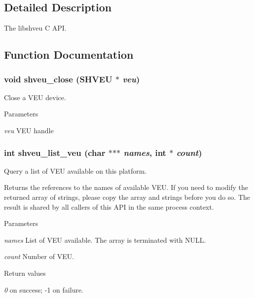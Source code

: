 \subsection{Detailed Description}
The libshveu C API. 

\subsection{Function Documentation}
\subsubsection[{shveu\_\-close}]{\setlength{\rightskip}{0pt plus 5cm}void shveu\_\-close (SHVEU $\ast$ {\em veu})}\label{shveu_8h_a84a58e9dc21e3597759d61284d2461f9}


Close a VEU device. 


\begin{DoxyParams}{Parameters}
\item[{\em veu}]VEU handle \end{DoxyParams}
\subsubsection[{shveu\_\-list\_\-veu}]{\setlength{\rightskip}{0pt plus 5cm}int shveu\_\-list\_\-veu (char $\ast$$\ast$$\ast$ {\em names}, \/  int $\ast$ {\em count})}\label{shveu_8h_a5496790d4d6f0b2d0b5524a9e0cd2e64}


Query a list of VEU available on this platform. 

Returns the references to the names of available VEU. If you need to modify the returned array of strings, please copy the array and strings before you do so. The result is shared by all callers of this API in the same process context. 
\begin{DoxyParams}{Parameters}
\item[{\em names}]List of VEU available. The array is terminated with NULL. \item[{\em count}]Number of VEU. \end{DoxyParams}

\begin{DoxyRetVals}{Return values}
\item[{\em 0}]on success; -\/1 on failure. \end{DoxyRetVals}
